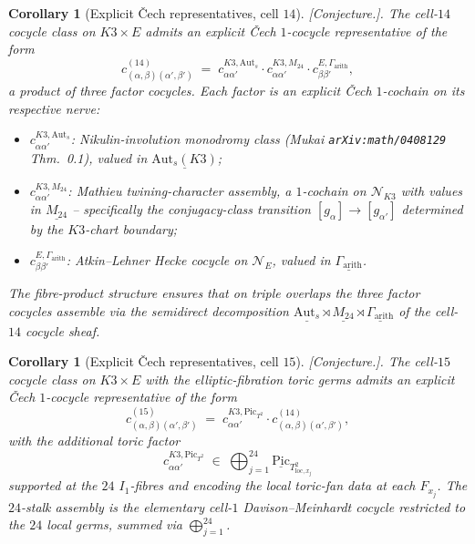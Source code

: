 \documentclass[11pt]{amsart}
\newtheorem{corollary}[theorem]{Corollary}
\providecommand{\Aut}{\mathrm{Aut}}
\providecommand{\Pic}{\mathrm{Pic}}
\providecommand{\cN}{\mathcal{N}}
\providecommand{\ClaimStatusConjectured}{[\emph{Conjecture.}]}
\begin{document}
\begin{corollary}[Explicit \v{C}ech representatives, cell $14$]
\label{cor:R13-cell-14-rep}
\ClaimStatusConjectured.
The cell-$14$ cocycle class on $K3 \times E$ admits an explicit
\v{C}ech $1$-cocycle representative of the form
\[
  c_{(\alpha, \beta)(\alpha', \beta')}^{(14)} \;=\;
  c^{K3,\mathrm{Aut}_s}_{\alpha \alpha'} \cdot
  c^{K3,M_{24}}_{\alpha \alpha'} \cdot
  c^{E, \Gamma_{\mathrm{arith}}}_{\beta \beta'},
\]
a product of three factor cocycles. Each factor is an explicit
\v{C}ech $1$-cochain on its respective nerve:
\begin{itemize}
\item $c^{K3,\mathrm{Aut}_s}_{\alpha \alpha'}$: Nikulin-involution
  monodromy class (Mukai \texttt{arXiv:math/0408129} Thm.~0.1), valued
  in $\underline{\Aut_s(K3)}$;
\item $c^{K3,M_{24}}_{\alpha \alpha'}$: Mathieu twining-character
  assembly, a $1$-cochain on $\cN_{K3}$ with values in
  $\underline{M_{24}}$ -- specifically the conjugacy-class transition
  $[g_\alpha] \to [g_{\alpha'}]$ determined by the $K3$-chart
  boundary;
\item $c^{E, \Gamma_{\mathrm{arith}}}_{\beta \beta'}$: Atkin--Lehner
  Hecke cocycle on $\cN_E$, valued in
  $\underline{\Gamma_{\mathrm{arith}}}$.
\end{itemize}
The fibre-product structure ensures that on triple overlaps the
three factor cocycles assemble via the semidirect decomposition
$\underline{\Aut_s} \rtimes \underline{M_{24}} \rtimes
\underline{\Gamma_{\mathrm{arith}}}$ of the cell-$14$ cocycle sheaf.
\end{corollary}

\begin{corollary}[Explicit \v{C}ech representatives, cell $15$]
\label{cor:R13-cell-15-rep}
\ClaimStatusConjectured.
The cell-$15$ cocycle class on $K3 \times E$ with the elliptic-fibration
toric germs admits an explicit \v{C}ech $1$-cocycle representative of
the form
\[
  c_{(\alpha, \beta)(\alpha', \beta')}^{(15)} \;=\;
  c^{K3, \Pic_{T^2}}_{\alpha \alpha'} \cdot
  c_{(\alpha, \beta)(\alpha', \beta')}^{(14)},
\]
with the additional toric factor
\[
  c^{K3, \Pic_{T^2}}_{\alpha \alpha'}
  \;\in\; \bigoplus_{j=1}^{24} \underline{\Pic}_{T^2_{\mathrm{loc}, x_j}}
\]
supported at the $24$ $I_1$-fibres and encoding the local toric-fan data
at each $F_{x_j}$. The $24$-stalk assembly is the elementary cell-$1$
Davison--Meinhardt cocycle restricted to the $24$ local germs, summed
via $\bigoplus_{j=1}^{24}$.
\end{corollary}
\end{document}

